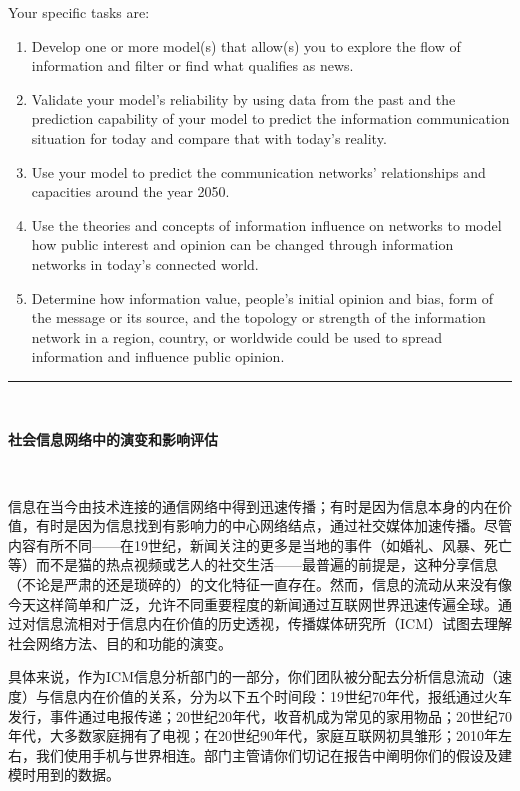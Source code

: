 \documentclass[bwprint]{cumcmthesis}
\begin{document}
\begin{shaded}
{\noindent Your specific tasks are:
\begin{enumerate}
\item Develop one or more model(s) that allow(s) you to explore the flow of information and filter or find what qualifies as news.
\item Validate your model's reliability by using data from the past and the prediction capability of your model to predict the information communication situation for today and compare that with today's reality.
\item Use your model to predict the communication networks' relationships and capacities around the year 2050.
\item Use the theories and concepts of information influence on networks to model how public interest and opinion can be changed through information networks in today's connected world.
\item Determine how information value, people's initial opinion and bias, form of the message or its source, and the topology or strength of the information network in a region, country, or worldwide could be used to spread information and influence public opinion.
\end{enumerate}


\noindent\rule{\textwidth}{0.1mm}
\normalsize\ 
\begin{center}
\textbf{社会信息网络中的演变和影响评估}
\end{center}

\small\ 

\noindent 信息在当今由技术连接的通信网络中得到迅速传播；有时是因为信息本身的内在价值，有时是因为信息找到有影响力的中心网络结点，通过社交媒体加速传播。尽管内容有所不同——在19世纪，新闻关注的更多是当地的事件（如婚礼、风暴、死亡等）而不是猫的热点视频或艺人的社交生活——最普遍的前提是，这种分享信息（不论是严肃的还是琐碎的）的文化特征一直存在。然而，信息的流动从来没有像今天这样简单和广泛，允许不同重要程度的新闻通过互联网世界迅速传遍全球。通过对信息流相对于信息内在价值的历史透视，传播媒体研究所（ICM）试图去理解社会网络方法、目的和功能的演变。\newline

\noindent 具体来说，作为ICM信息分析部门的一部分，你们团队被分配去分析信息流动（速度）与信息内在价值的关系，分为以下五个时间段：19世纪70年代，报纸通过火车发行，事件通过电报传递；20世纪20年代，收音机成为常见的家用物品；20世纪70年代，大多数家庭拥有了电视；在20世纪90年代，家庭互联网初具雏形；2010年左右，我们使用手机与世界相连。部门主管请你们切记在报告中阐明你们的假设及建模时用到的数据。\newline

}
\end{shaded}
\end{document}
